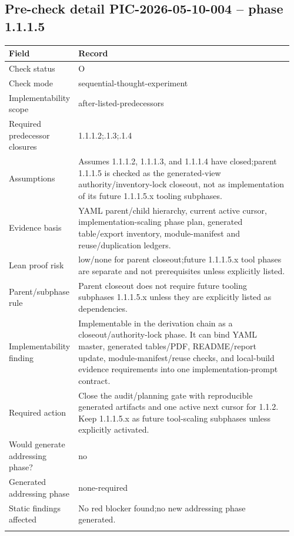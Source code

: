 \subsection*{Pre-check detail PIC-2026-05-10-004 -- phase 1.1.1.5}
\begin{longtable}{L{0.18\linewidth} L{0.78\linewidth}}
\hline
\textbf{Field} & \textbf{Record}\\
\hline
Check status & O\\
\hline\addlinespace[0.20em]
Check mode & sequential-thought-experiment\\
\hline\addlinespace[0.20em]
Implementability scope & after-listed-predecessors\\
\hline\addlinespace[0.20em]
Required predecessor closures & 1.1.1.2;.1.3;.1.4\\
\hline\addlinespace[0.20em]
Assumptions & Assumes 1.1.1.2, 1.1.1.3, and 1.1.1.4 have closed;\newline parent 1.1.1.5 is checked as the generated-view authority/\allowbreak{}inventory-lock closeout, not as implementation of its future 1.1.1.5.x tooling subphases.\\
\hline\addlinespace[0.20em]
Evidence basis & YAML parent/\allowbreak{}child hierarchy, current active cursor, implementation-scaling phase plan, generated table/\allowbreak{}export inventory, module-manifest and reuse/\allowbreak{}duplication ledgers.\\
\hline\addlinespace[0.20em]
Lean proof risk & low/\allowbreak{}none for parent closeout;\newline future 1.1.1.5.x tool phases are separate and not prerequisites unless explicitly listed.\\
\hline\addlinespace[0.20em]
Parent/\allowbreak{}subphase rule & Parent closeout does not require future tooling subphases 1.1.1.5.x unless they are explicitly listed as dependencies.\\
\hline\addlinespace[0.20em]
Implementability finding & Implementable in the derivation chain as a closeout/\allowbreak{}authority-lock phase. It can bind YAML master, generated tables/\allowbreak{}PDF, README/\allowbreak{}report update, module-manifest/\allowbreak{}reuse checks, and local-build evidence requirements into one implementation-prompt contract.\\
\hline\addlinespace[0.20em]
Required action & Close the audit/\allowbreak{}planning gate with reproducible generated artifacts and one active next cursor for 1.1.2. Keep 1.1.1.5.x as future tool-scaling subphases unless explicitly activated.\\
\hline\addlinespace[0.20em]
Would generate addressing phase? & no\\
\hline\addlinespace[0.20em]
Generated addressing phase & none-required\\
\hline\addlinespace[0.20em]
Static findings affected & No red blocker found;\newline no new addressing phase generated.\\
\hline\addlinespace[0.20em]
\end{longtable}
